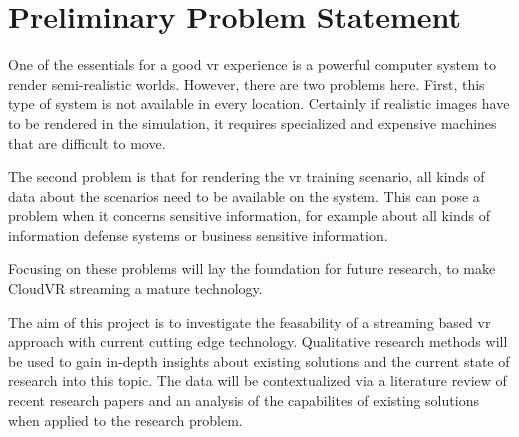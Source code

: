 \section{Preliminary Problem Statement}
One of the essentials for a good \acrfull{vr} experience is a powerful computer system to render semi-realistic
worlds. However, there are two problems here. First, this type of system is not available in every location.
Certainly if realistic images have to be rendered in the simulation, it requires specialized and expensive machines that are difficult to move. 

The second problem is that for rendering the \acrshort{vr} training scenario, all kinds of data about the scenarios need to be available on the system. 
This can pose a problem when it concerns sensitive information, for example about all kinds of information
defense systems or business sensitive information.

Focusing on these problems will lay the foundation for future research, to make CloudVR streaming a mature technology.

The aim of this project is to investigate the feasability of a streaming based \acrshort{vr} approach with current cutting edge technology.
Qualitative research methods will be used to gain in-depth insights about existing solutions and the current state of research into this topic.
The data will be contextualized via a literature review of recent research papers and an analysis of the capabilites of existing solutions when applied to the research problem.